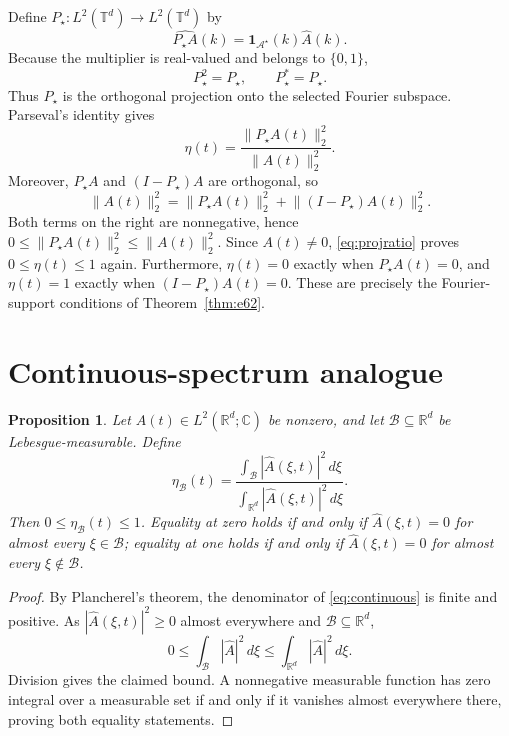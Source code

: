 \documentclass[11pt]{article}
\newtheorem{proposition}{Proposition}
\newcommand{\T}{\mathbb{T}}
\newcommand{\R}{\mathbb{R}}
\newcommand{\C}{\mathbb{C}}
\newcommand{\one}{\mathbf{1}}
\newcommand{\norm}[1]{\lVert #1\rVert}
\begin{document}
Define $P_\star:L^2(\T^d)\to L^2(\T^d)$ by
\begin{equation}\label{eq:projector}
\widehat{P_\star A}(k)
=\one_{\mathcal A^\star}(k)\widehat A(k).
\end{equation}
Because the multiplier is real-valued and belongs to $\{0,1\}$,
\begin{equation}
P_\star^2=P_\star,\qquad P_\star^*=P_\star.
\end{equation}
Thus $P_\star$ is the orthogonal projection onto the selected Fourier
subspace. Parseval's identity gives
\begin{equation}\label{eq:projratio}
\eta(t)=\frac{\norm{P_\star A(t)}_2^2}{\norm{A(t)}_2^2}.
\end{equation}
Moreover, $P_\star A$ and $(I-P_\star)A$ are orthogonal, so
\begin{equation}\label{eq:pythag}
\norm{A(t)}_2^2
=\norm{P_\star A(t)}_2^2
+\norm{(I-P_\star)A(t)}_2^2.
\end{equation}
Both terms on the right are nonnegative, hence
$0\leq\norm{P_\star A(t)}_2^2\leq\norm{A(t)}_2^2$.
Since $A(t)\neq0$, \eqref{eq:projratio} proves
$0\leq\eta(t)\leq1$ again. Furthermore, $\eta(t)=0$ exactly when
$P_\star A(t)=0$, and $\eta(t)=1$ exactly when
$(I-P_\star)A(t)=0$. These are precisely the Fourier-support
conditions of Theorem~\ref{thm:e62}.

\section{Continuous-spectrum analogue}

\begin{proposition}\label{prop:continuous}
Let $A(t)\in L^2(\R^d;\C)$ be nonzero, and let
$\mathcal B\subseteq\R^d$ be Lebesgue-measurable. Define
\begin{equation}\label{eq:continuous}
\eta_{\mathcal B}(t)
=\frac{\displaystyle\int_{\mathcal B}
|\widehat A(\xi,t)|^2\,d\xi}
{\displaystyle\int_{\R^d}
|\widehat A(\xi,t)|^2\,d\xi}.
\end{equation}
Then $0\leq\eta_{\mathcal B}(t)\leq1$. Equality at zero holds if
and only if $\widehat A(\xi,t)=0$ for almost every $\xi\in\mathcal B$;
equality at one holds if and only if $\widehat A(\xi,t)=0$ for almost
every $\xi\notin\mathcal B$.
\end{proposition}

\begin{proof}
By Plancherel's theorem, the denominator of
\eqref{eq:continuous} is finite and positive. As
$|\widehat A(\xi,t)|^2\geq0$ almost everywhere and
$\mathcal B\subseteq\R^d$,
\[
0\leq\int_{\mathcal B}|\widehat A|^2\,d\xi
\leq\int_{\R^d}|\widehat A|^2\,d\xi.
\]
Division gives the claimed bound. A nonnegative measurable function
has zero integral over a measurable set if and only if it vanishes
almost everywhere there, proving both equality statements.
\end{proof}
\end{document}

